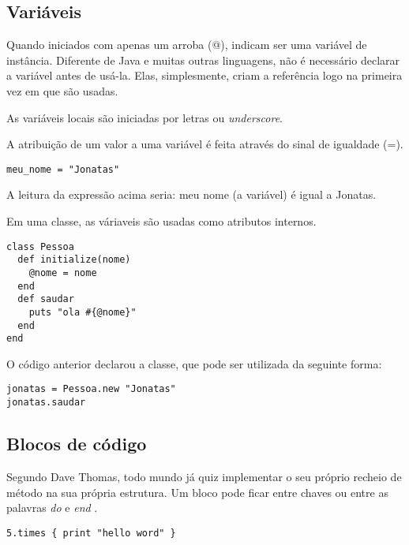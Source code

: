 \documentclass[espaco=simples,appendix=Name]{abnt}
\begin{document}
\subsection{ Variáveis } 

Quando iniciados com apenas um arroba (@), indicam ser uma variável de instância. Diferente de Java e muitas outras linguagens, não é necessário declarar a variável antes de usá-la. Elas, simplesmente, criam a referência logo na primeira vez em que são usadas.

As variáveis locais são iniciadas por letras ou \textit{underscore}.

A atribuição de um valor a uma variável é feita através do sinal de igualdade (=).

\begin{lstlisting}[caption=Exemplo de variável local ]
meu_nome = "Jonatas"
\end{lstlisting}

A leitura da expressão acima seria: meu nome (a variável) é igual a Jonatas.

Em uma classe, as váriaveis são usadas como atributos internos.

\begin{lstlisting}[caption=Exemplo de variável de instância em uma classe ]
class Pessoa
  def initialize(nome)
    @nome = nome
  end
  def saudar
    puts "ola #{@nome}"
  end
end
\end{lstlisting}

O código anterior declarou a classe, que pode ser utilizada da seguinte forma:

\begin{lstlisting}[caption=Exemplo de utilização da classe descrita acima ]
jonatas = Pessoa.new "Jonatas"
jonatas.saudar 
\end{lstlisting}

\subsection { Blocos de código }

\cite{programmingRuby}
Segundo Dave Thomas, todo mundo já quiz implementar o seu próprio recheio de método na sua própria estrutura. Um bloco pode ficar entre chaves ou entre as palavras \textit{ do } e \textit{ end }.

\begin{lstlisting}[caption=Exemplo de bloco de código ]
   5.times { print "hello word" }
\end{lstlisting}
\end{document}
